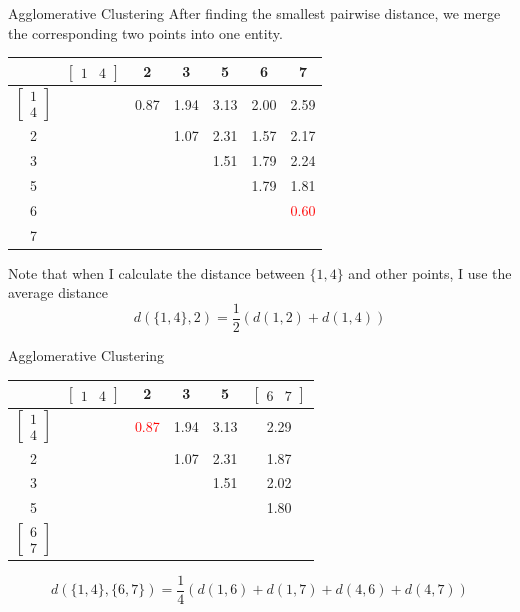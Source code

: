 \documentclass{beamer}
\begin{document}
	\begin{frame}{Agglomerative Clustering}
		After finding the smallest pairwise distance, we merge the corresponding two points into one entity.
		\begin{table}[htbp]
			\begin{tabular}{c|cccccc}
				&$\begin{bmatrix}1&4 \end{bmatrix}$ & 2 & 3 & 5 & 6 & 7\\
				\hline
				$\begin{bmatrix}1\\4 \end{bmatrix}$&&0.87&1.94&3.13&2.00&2.59\\
				2&&&1.07&2.31&1.57&2.17\\
				3&&&&1.51&1.79&2.24\\
				5&&&&&1.79&1.81\\
				6&&&&&&\textcolor{red}{0.60}\\
				7&&&&&&\\
			\end{tabular}
		\end{table}
	
		Note that when I calculate the distance between $\{1, 4\}$ and other points, I use the average distance
		\[d\left(\{1, 4\}, 2\right) = \frac{1}{2}\left( d(1,2) + d(1,4) \right) \]
	\end{frame}
	
	\begin{frame}{Agglomerative Clustering}
		\begin{table}[htbp]
			\centering
			\begin{tabular}{c|ccccc}
				&$\begin{bmatrix}1&4 \end{bmatrix}$ & 2&3&5& $\begin{bmatrix}6&7 \end{bmatrix}$\\
				\hline
				$\begin{bmatrix}1\\4 \end{bmatrix}$ & &\textcolor{red}{0.87} &1.94&3.13&2.29\\
				2&&&1.07&2.31&1.87\\
				3&&&&1.51&2.02\\
				5&&&&&1.80\\
				$\begin{bmatrix}6\\7 \end{bmatrix}$&&&&&\\
			\end{tabular}
		\end{table}
	
	\[ d\left(\{1, 4\}, \{6, 7\}\right) =  \frac{1}{4}\left( d(1,6) + d(1,7) + d(4,6) + d(4,7)\right)\]
	\end{frame}
	
\end{document}
